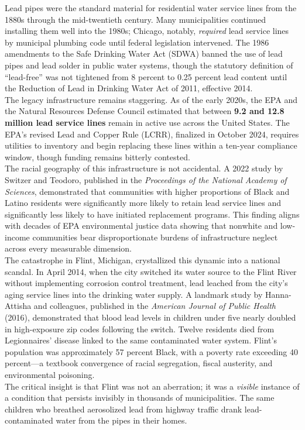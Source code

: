 \documentclass[
]{article}
\begin{document}
Lead pipes were the standard material for residential water service
lines from the 1880s through the mid-twentieth century. Many
municipalities continued installing them well into the 1980s; Chicago,
notably, \emph{required} lead service lines by municipal plumbing code
until federal legislation intervened. The 1986 amendments to the Safe
Drinking Water Act (SDWA) banned the use of lead pipes and lead solder
in public water systems, though the statutory definition of
``lead-free'' was not tightened from 8 percent to 0.25 percent lead
content until the Reduction of Lead in Drinking Water Act of 2011,
effective 2014.\\
The legacy infrastructure remains staggering. As of the early 2020s, the
EPA and the Natural Resources Defense Council estimated that between
\textbf{9.2 and 12.8 million lead service lines} remain in active use
across the United States. The EPA's revised Lead and Copper Rule (LCRR),
finalized in October 2024, requires utilities to inventory and begin
replacing these lines within a ten-year compliance window, though
funding remains bitterly contested.\\
The racial geography of this infrastructure is not accidental. A 2022
study by Switzer and Teodoro, published in the \emph{Proceedings of the
National Academy of Sciences}, demonstrated that communities with higher
proportions of Black and Latino residents were significantly more likely
to retain lead service lines and significantly less likely to have
initiated replacement programs. This finding aligns with decades of EPA
environmental justice data showing that nonwhite and low-income
communities bear disproportionate burdens of infrastructure neglect
across every measurable dimension.\\
The catastrophe in Flint, Michigan, crystallized this dynamic into a
national scandal. In April 2014, when the city switched its water source
to the Flint River without implementing corrosion control treatment, lead
leached from the city's aging service lines into the drinking water
supply. A landmark study by Hanna-Attisha and colleagues, published in
the \emph{American Journal of Public Health} (2016), demonstrated that
blood lead levels in children under five nearly doubled in
high-exposure zip codes following the switch. Twelve residents died from
Legionnaires' disease linked to the same contaminated water system.
Flint's population was approximately 57 percent Black, with a poverty
rate exceeding 40 percent---a textbook convergence of racial segregation,
fiscal austerity, and environmental poisoning.\\
The critical insight is that Flint was not an aberration; it was a
\emph{visible} instance of a condition that persists invisibly in
thousands of municipalities. The same children who breathed aerosolized
lead from highway traffic drank lead-contaminated water from the pipes
in their homes.
\end{document}
